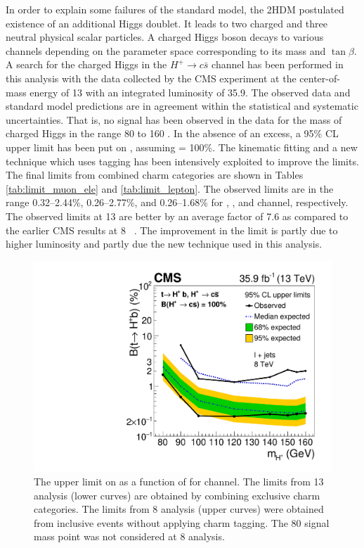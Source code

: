 
In order to explain some failures of the standard model, the 2HDM 
postulated existence of an additional Higgs doublet. It leads to two 
charged and three neutral physical scalar particles. A charged Higgs 
boson decays to various channels depending on the parameter space 
corresponding to its mass and $\tan\beta$. A search for the charged 
Higgs in the $H^+ \to c\bar{s}$ channel has been performed in this 
analysis with the data collected by the CMS experiment at the 
center-of-mass energy of 13 \TeV with an integrated luminosity of 
35.9\fbinv. The observed data and standard model predictions are in 
agreement within the statistical and systematic uncertainties. That is, 
no signal has been observed in the data for the mass of charged Higgs 
in the range 80 to 160 \GeV. In the absence of an excess, a 95\% CL 
upper limit has been put on \brThb, assuming \brHcs = 100\%. The 
kinematic fitting and a new technique which uses \PQc tagging has been 
intensively exploited to improve the limits. The final limits from 
combined charm categories are shown in Tables 
\ref{tab:limit_muon_ele} and \ref{tab:limit_lepton}. The observed 
limits are in the range 0.32--2.44\%, 0.26--2.77\%, and 0.26--1.68\% 
for \mujets, \ejets, and \ljets channel, respectively. The observed 
limits at 13 \TeV are better by an average factor of 7.6 as compared 
to the earlier CMS results at 8 \TeV~\cite{Khachatryan:2015uua}. The 
improvement in the limit is partly due to higher luminosity and partly 
due the new technique used in this analysis. 

\begin{figure}
    \centering
    \includegraphics[width=0.5\linewidth]{Image/Limit/limit_8TeV_vs_13TeV.pdf}
    \caption{The upper limit on \brThb as a function of \mHp for \ljets 
        channel. The limits from 13 \TeV analysis (lower curves) are 
        obtained by combining exclusive charm categories. The limits 
        from 8 \TeV analysis (upper curves) were obtained from inclusive 
        events without applying charm tagging. The 80 \GeV signal mass 
        point was not considered at 8 \TeV analysis.}
\label{fig:limit_8TeV_vs_13TeV}
\end{figure}

